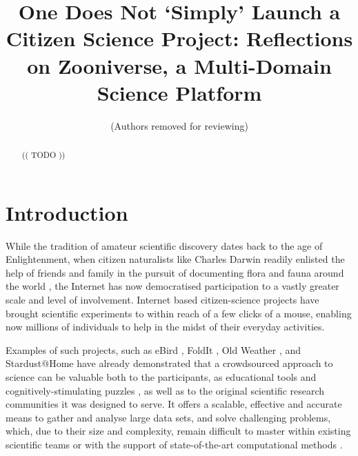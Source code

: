 \documentclass{sigchi}
\begin{document}
\title{One Does Not `Simply' Launch a Citizen Science Project: Reflections on Zooniverse, a Multi-Domain Science Platform}

 \author{ (Authors removed for reviewing) }
% 
% 
% 


\maketitle

\begin{abstract}

(( TODO ))

\end{abstract}




\section{Introduction}


While the tradition of amateur scientific discovery dates back to the age of Enlightenment, when citizen naturalists like Charles Darwin readily enlisted the help of friends and family in the pursuit of documenting flora and fauna around the world \cite{silvertown2009new}, the Internet has now democratised participation to a vastly greater scale and level of involvement.  Internet based citizen-science projects have brought scientific experiments to within reach of a few clicks of a mouse, enabling now millions of individuals to help in the midst of their everyday activities.

Examples of such projects, such as eBird \cite{wood2011ebird}, FoldIt \cite{khatib2011algorithm}, Old Weather \cite{}, and Stardust@Home \cite{westphal2005stardust} have already demonstrated that a crowdsourced approach to science can be valuable both to the participants, as educational tools and cognitively-stimulating puzzles \cite{gray2012lessons}, as well as to the original scientific research communities it was designed to serve. It offers a scalable, effective and accurate means to gather and analyse large data sets, and solve challenging problems, which, due to their size and complexity, remain difficult to master within existing scientific teams or with the support of state-of-the-art computational methods \cite{fortson2011galaxy,lintott2008galaxy,simpson2013dynamic}. %
\end{document}
